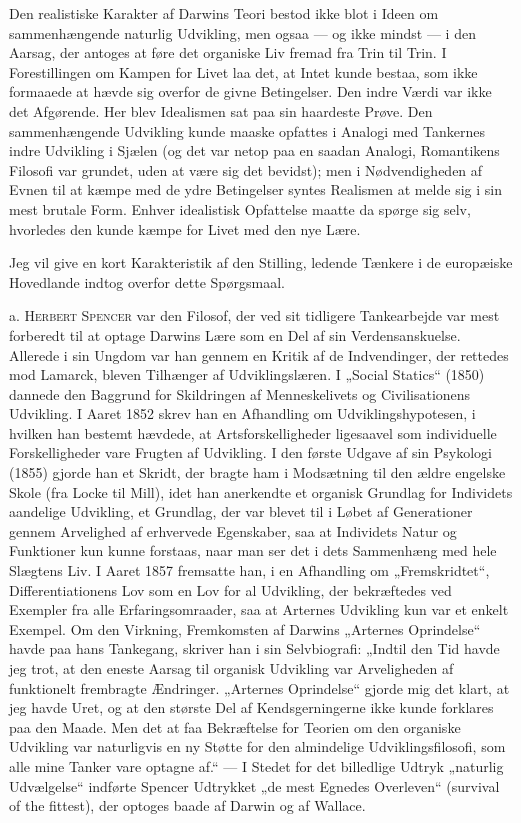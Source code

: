\documentclass[12pt,a4paper,openany]{book}
\newcommand{\opage}[1]{\marginnote{\footnotesize\textit{[#1]}}}
\begin{document}
Den realistiske Karakter af Darwins Teori bestod ikke
blot i Ideen om sammenhængende naturlig Udvikling, men
ogsaa --- og ikke mindst --- i den Aarsag, der antoges at føre
det organiske Liv fremad fra Trin til Trin. I Forestillingen
om Kampen for Livet laa det, at Intet kunde bestaa, som ikke
formaaede at hævde sig overfor de givne Betingelser. Den
indre Værdi var ikke det Afgørende. Her blev Idealismen sat
paa sin haardeste Prøve. Den sammenhængende Udvikling
kunde maaske opfattes i Analogi med Tankernes indre Udvikling
i Sjælen (og det var netop paa en saadan Analogi, Romantikens
Filosofi var grundet, uden at være sig det bevidst); men
i Nødvendigheden af Evnen til at kæmpe med de ydre Betingelser
syntes Realismen at melde sig i sin mest brutale
Form. Enhver idealistisk Opfattelse maatte da spørge sig selv,
hvorledes den kunde kæmpe for Livet med den nye Lære.

Jeg vil give en kort Karakteristik af den Stilling, ledende
Tænkere i de europæiske Hovedlande indtog overfor dette
Spørgsmaal.

a. \textsc{Herbert Spencer} var den Filosof, der ved sit tidligere
Tankearbejde var mest forberedt til at optage Darwins
Lære som en Del af sin Verdensanskuelse. Allerede i sin
Ungdom var han gennem en Kritik af de Indvendinger, der
\setcounter{footnote}{0}%
\opage{210}rettedes mod Lamarck, bleven Tilhænger af Udviklingslæren. I
„Social Statics“ (1850) dannede den Baggrund for Skildringen
af Menneskelivets og Civilisationens Udvikling. I Aaret 1852
skrev han en Afhandling om Udviklingshypotesen, i hvilken
han bestemt hævdede, at Artsforskelligheder ligesaavel som
individuelle Forskelligheder vare Frugten af Udvikling. I den
første Udgave af sin Psykologi (1855) gjorde han et Skridt,
der bragte ham i Modsætning til den ældre engelske Skole
(fra Locke til Mill), idet han anerkendte et organisk Grundlag for
Individets aandelige Udvikling, et Grundlag, der var blevet til i Løbet
af Generationer gennem Arvelighed af erhvervede Egenskaber,
saa at Individets Natur og Funktioner kun kunne forstaas, naar
man ser det i dets Sammenhæng med hele Slægtens Liv. I
Aaret 1857 fremsatte han, i en Afhandling om „Fremskridtet“,
Differentiationens Lov som en Lov for al Udvikling, der bekræftedes
ved Exempler fra alle Erfaringsomraader, saa at
Arternes Udvikling kun var et enkelt Exempel. Om den Virkning,
Fremkomsten af Darwins „Arternes Oprindelse“ havde
paa hans Tankegang, skriver han i sin Selvbiografi: „Indtil den
Tid havde jeg trot, at den eneste Aarsag til organisk Udvikling
var Arveligheden af funktionelt frembragte Ændringer. „Arternes
Oprindelse“ gjorde mig det klart, at jeg havde Uret, og at
den største Del af Kendsgerningerne ikke kunde forklares paa
den Maade. Men det at faa Bekræftelse for Teorien om den
organiske Udvikling var naturligvis en ny Støtte for den almindelige
Udviklingsfilosofi, som alle mine Tanker vare optagne
af.“ --- I Stedet for det billedlige Udtryk „naturlig Udvælgelse“
indførte Spencer Udtrykket „de mest Egnedes Overleven“
(survival of the fittest), der optoges baade af Darwin og
af Wallace.
\end{document}
